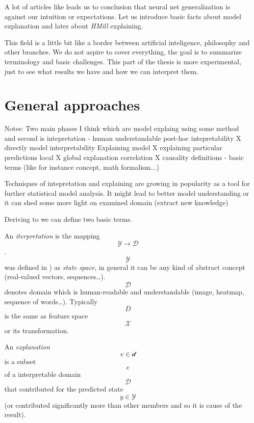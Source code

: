 A lot of articles like \cite{Zhang2016} leads us to conclusion that neural net generalization is against our intuition or expectations. Let us introduce basic facts about model 
explanation and later about \emph{HMill} explaining.

This field is a little bit like a border between artificial inteligence, philosophy and other branches. We do not aspire to cover everything, the goal is to summarize terminology and basic challenges. This part of the thesis is more experimental, just to see what results we have and how we can interpret them.

\section{General approaches}

Notes:
Two main phases I think which are model explaing using some method and second is intepretation - human understandable
post-hoc intepretability X directly model interpretability
Explaining model X explaining particular predictions
local X global explanation
correlation X causality
definitions - basic terms (like for instance concept, math formalism...)

\cite{Montavon2018}
Techniques of intepretation and explaining are growing in popularity as a tool for further statistical model analysis. It might lead to better model understanding or it can shed some more light on examined domain (extract new knowledge) \cite{Montavon2018}

Deriving to \cite{Montavon2018} we can define two basic terms.
\begin{definition}
An \emph{iterpretation} is the mapping $$\mathcal{Y}\rightarrow\mathcal{D}$$. $$\mathcal{Y}$$ was defined in ) as \emph{state space}, in general it can be any kind of abstract concept (real-valued vectors, sequences\dots).  $$\mathcal{D}$$ denotes domain which is human-readable and understandable (image, heatmap, sequence of words\dots). Typically $$D$$ is the same as feature space  $$\mathcal{X}$$ or its transformation.
\end{definition}

\begin{definition}
    An \emph{explanation} $$e \in \mathcal{d}$$ is a subset $$e$$ of a interpretable domain $$\mathcal{D}$$ that contributed for the predicted state $$y \in \mathcal{Y}$$ (or contributed significantly more than other members and so it is cause of the result).
\end{definition}

